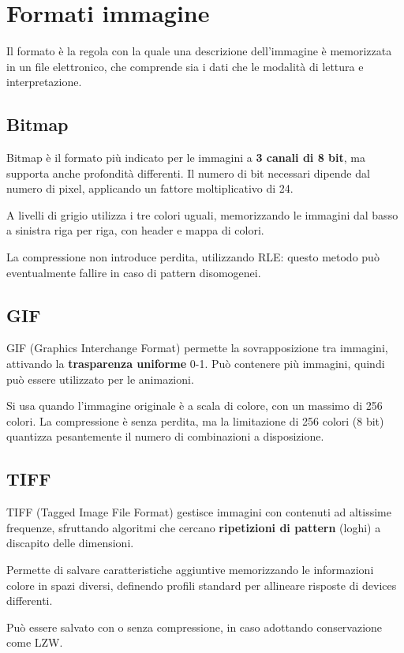 \section{Formati immagine}
Il formato è la regola con la quale una descrizione dell'immagine è memorizzata in un file elettronico, che comprende sia i dati che le modalità di lettura e interpretazione.

\subsection{Bitmap}
Bitmap è il formato più indicato per le immagini a \textbf{3 canali di 8 bit}, ma supporta anche profondità differenti. Il numero di bit necessari dipende dal numero di pixel, applicando un fattore moltiplicativo di 24.

A livelli di grigio utilizza i tre colori uguali, memorizzando le immagini dal basso a sinistra riga per riga, con header e mappa di colori.

La compressione non introduce perdita, utilizzando RLE: questo metodo può eventualmente fallire in caso di pattern disomogenei. 

\subsection{GIF}
GIF (Graphics Interchange Format) permette la sovrapposizione tra immagini, attivando la \textbf{trasparenza uniforme} 0-1. Può contenere più immagini, quindi può essere utilizzato per le animazioni.

Si usa quando l'immagine originale è a scala di colore, con un massimo di 256 colori. La compressione è senza perdita, ma la limitazione di 256 colori (8 bit) quantizza pesantemente il numero di combinazioni a disposizione.

\subsection{TIFF}
TIFF (Tagged Image File Format) gestisce immagini con contenuti ad altissime frequenze, sfruttando algoritmi che cercano \textbf{ripetizioni di pattern} (loghi) a discapito delle dimensioni.

Permette di salvare caratteristiche aggiuntive memorizzando le informazioni colore in spazi diversi, definendo profili standard per allineare risposte di devices differenti.

Può essere salvato con o senza compressione, in caso adottando conservazione come LZW.

